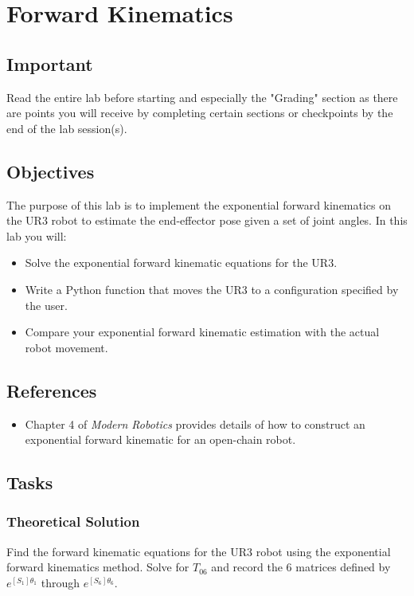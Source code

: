 \chapter{Forward Kinematics}
\section{Important}
Read the entire lab before starting and especially the "Grading" section as there are points you will receive by completing certain sections or checkpoints
by the end of the lab session(s). 
\section{Objectives}
The purpose of this lab is to implement the exponential forward kinematics on the UR3 robot to estimate the end-effector pose given a set of joint angles.  In this lab you will:
\begin{itemize}
	\item Solve the exponential forward kinematic equations for the UR3.
	\item Write a Python function that moves the UR3 to a configuration specified by the user.
	\item Compare your exponential forward kinematic estimation with the actual robot movement. 
\end{itemize}

\section{References}
\begin{itemize}
\item Chapter 4 of \textit{Modern Robotics} provides details of how to construct an exponential forward kinematic for an open-chain robot.
\end{itemize}

\section{Tasks}

\subsection{Theoretical Solution}
Find the forward kinematic equations for the UR3 robot using the exponential forward kinematics method.  Solve for $T_{06}$ and record the 6 matrices defined by $e^{[S_1]\theta_1}$ through $e^{[S_6]\theta_6}$.

